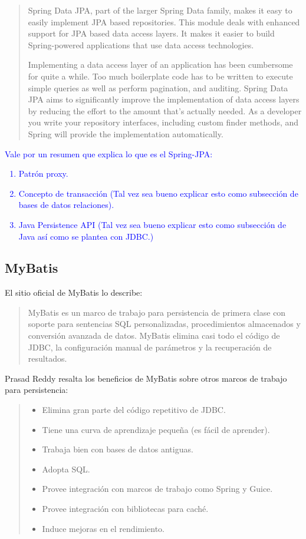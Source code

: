 \begin{quote}
	Spring Data JPA, part of the larger Spring Data family, makes it easy to easily implement JPA based repositories. This module deals with enhanced support for JPA based data access layers. It makes it easier to build Spring-powered applications that use data access technologies.

Implementing a data access layer of an application has been cumbersome for quite a while. Too much boilerplate code has to be written to execute simple queries as well as perform pagination, and auditing. Spring Data JPA aims to significantly improve the implementation of data access layers by reducing the effort to the amount that’s actually needed. As a developer you write your repository interfaces, including custom finder methods, and Spring will provide the implementation automatically.
\end{quote}

\textcolor{blue}{Vale por un resumen que explica lo que es el Spring-JPA:
\begin{enumerate}
	\item Patrón proxy.
	\item Concepto de transacción (Tal vez sea bueno explicar esto como subsección de bases de datos relaciones).
	\item Java Persistence API (Tal vez sea bueno explicar esto como subsección de Java así como se plantea con JDBC.)
\end{enumerate}
}

\subsection{MyBatis}\label{sec-mybatis}
El sitio oficial de MyBatis\cite{MyBatis} lo describe: 
\begin{quote}
MyBatis es un marco de trabajo para persistencia de primera clase con soporte para sentencias SQL personalizadas, procedimientos almacenados y conversión avanzada de datos. MyBatis elimina casi todo el código de JDBC, la configuración manual de parámetros y la recuperación de resultados.
\end{quote}


Prasad Reddy\cite{PersistenceWithMyBatis} resalta los beneficios de MyBatis sobre otros marcos de trabajo para persistencia:
\begin{quote}
	\begin{itemize}
		\item Elimina gran parte del código repetitivo de JDBC.
		\item Tiene una curva de aprendizaje pequeña (es fácil de aprender).
		\item Trabaja bien con bases de datos antiguas.
		\item Adopta SQL.
		\item Provee integración con marcos de trabajo como Spring y Guice.
		\item Provee integración con bibliotecas para caché.
		\item Induce mejoras en el rendimiento.
	\end{itemize}
\end{quote}

